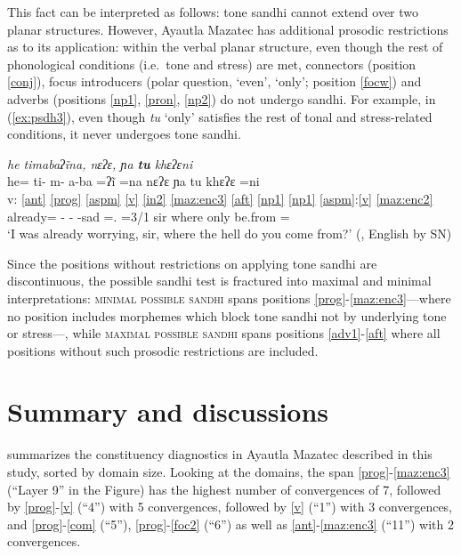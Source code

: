\documentclass[output=paper]{langscibook}
\begin{document}
This fact can be interpreted as follows: tone sandhi cannot extend over two planar structures. However, Ayautla Mazatec has additional prosodic restrictions as to its application: within the verbal planar structure, even though the rest of phonological conditions (i.e.~tone and stress) are met, connectors (position \ref{conj}), focus introducers (polar question, `even', `only'; position \ref{focw}) and adverbs (positions \ref{np1}, \ref{pron}, \ref{np2}) do not undergo sandhi. For example, in (\ref{ex:psdh3}), even though \textit{tu\1} `only' satisfies the rest of tonal and stress-related conditions, it never undergoes tone sandhi.

\ea \label{ex:psdh3} \textit{he\2 ti\2ma\4\st{}ba\2ʔĩ\2na\4\2, nɛ\1ʔɛ\3, \st{}ɲa\4 \textbf{\st{}tu\1} k\lab{}hɛ\2\st{}ʔɛ\1ni\2\3}\\
\glll {} he\2\ff{}= ti\2\ff- m- a\4-ba\2 =ʔĩ\3\ff{} =na\1 nɛ\1ʔɛ\3\ff{}  ɲa\4\ff{} tu\1 k\lab{}hɛ\2ʔɛ\1 =ni\2\3\\
v: \ref{ant} \ref{prog} \ref{aspm} \ref{v} \ref{in2} \ref{maz:enc3} \ref{aft} \ref{np1} \ref{np1} \ref{aspm}:\ref{v} \ref{maz:enc2}\\
{} already= \Prog- \Hab{}- \Inch{}-sad =\Pst.\Hab{} =3/1\Sg{} sir where only be.from =\Asr{}\\
\glt `I was already worrying, sir, where the hell do you come from?' (\citealt[141]{sanchez20}, English by SN)\\
\z

Since the positions without restrictions on applying tone sandhi are discontinuous, the possible sandhi test is fractured into maximal and minimal interpretations: \textsc{minimal possible sandhi} spans positions \ref{prog}-\ref{maz:enc3}—where no position includes morphemes which block tone sandhi not by underlying tone or stress—, while \textsc{maximal possible sandhi} spans positions \ref{adv1}-\ref{aft} where all positions without such prosodic restrictions are included.


\section{Summary and discussions}\label{sec-concl}
 summarizes the constituency diagnostics in Ayautla Mazatec described in this study, sorted by domain size. Looking at the domains, the span \ref{prog}-\ref{maz:enc3} (``Layer 9'' in the Figure) has the highest number of convergences of 7, followed by \ref{prog}-\ref{v} (``4'') with 5 convergences, followed by \ref{v} (``1'') with 3 convergences, and \ref{prog}-\ref{com} (``5''), \ref{prog}-\ref{foc2} (``6'') as well as \ref{ant}-\ref{maz:enc3} (``11'') with 2 convergences.
\end{document}

